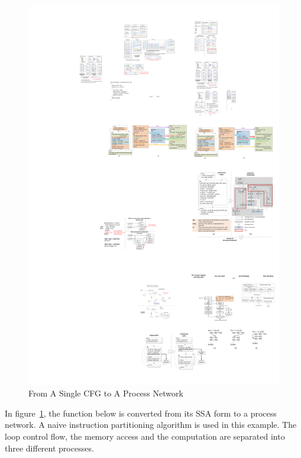 \documentclass{sig-alternate}
\begin{document}
\begin{figure}[htp]
\begin{center}
\includegraphics[width=1.0\linewidth]{fig/convert.pdf}
\caption{From A Single CFG to A Process Network
\label{fig:totalFlow}}
\end{center}
\vspace{-2.0em}
\end{figure}

In figure~\ref{fig:totalFlow}, the function below is converted from its SSA form to a process network.  A naive instruction partitioning algorithm is used in this example. The loop control flow, the memory access and the computation are separated into three different
processes.
\end{document}
